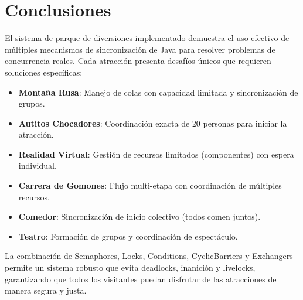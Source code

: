 \documentclass[12pt,a4paper]{article}
\begin{document}
\section{Conclusiones}

El sistema de parque de diversiones implementado demuestra el uso efectivo de múltiples mecanismos de sincronización de Java para resolver problemas de concurrencia reales. Cada atracción presenta desafíos únicos que requieren soluciones específicas:

\begin{itemize}
    \item \textbf{Montaña Rusa}: Manejo de colas con capacidad limitada y sincronización de grupos.
    \item \textbf{Autitos Chocadores}: Coordinación exacta de 20 personas para iniciar la atracción.
    \item \textbf{Realidad Virtual}: Gestión de recursos limitados (componentes) con espera individual.
    \item \textbf{Carrera de Gomones}: Flujo multi-etapa con coordinación de múltiples recursos.
    \item \textbf{Comedor}: Sincronización de inicio colectivo (todos comen juntos).
    \item \textbf{Teatro}: Formación de grupos y coordinación de espectáculo.
\end{itemize}

La combinación de Semaphores, Locks, Conditions, CyclicBarriers y Exchangers permite un sistema robusto que evita deadlocks, inanición y livelocks, garantizando que todos los visitantes puedan disfrutar de las atracciones de manera segura y justa.
\end{document}
